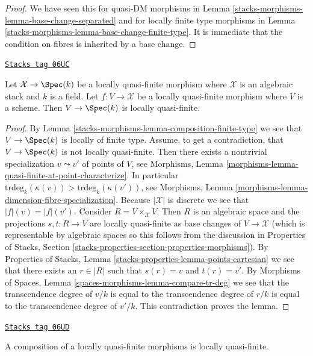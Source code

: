 \begin{proof}
We have seen this for quasi-DM morphisms in
Lemma \ref{stacks-morphisms-lemma-base-change-separated}
and for locally finite type morphisms in
Lemma \ref{stacks-morphisms-lemma-base-change-finite-type}.
It is immediate that the condition on fibres is inherited by a base change.
\end{proof}

\begin{lemma}
\label{stacks-morphisms-lemma-locally-quasi-finite-over-field}
\href{https://stacks.math.columbia.edu/tag/06UC}{\texttt{Stacks tag 06UC}}

Let $\mathcal{X} \to \Spec(k)$ be a locally quasi-finite morphism
where $\mathcal{X}$ is an algebraic stack and $k$ is a field.
Let $f : V \to \mathcal{X}$ be a locally quasi-finite morphism where
$V$ is a scheme. Then $V \to \Spec(k)$ is locally quasi-finite.
\end{lemma}

\begin{proof}
By
Lemma \ref{stacks-morphisms-lemma-composition-finite-type}
we see that $V \to \Spec(k)$ is locally of finite type.
Assume, to get a contradiction, that $V \to \Spec(k)$ is not
locally quasi-finite. Then there exists a nontrivial specialization
$v \leadsto v'$ of points of $V$, see
Morphisms, Lemma \ref{morphisms-lemma-quasi-finite-at-point-characterize}.
In particular $\text{trdeg}_k(\kappa(v)) > \text{trdeg}_k(\kappa(v'))$, see
Morphisms, Lemma \ref{morphisms-lemma-dimension-fibre-specialization}.
Because $|\mathcal{X}|$ is discrete we see that $|f|(v) = |f|(v')$.
Consider $R = V \times_\mathcal{X} V$. Then $R$ is an algebraic space
and the projections $s, t : R \to V$ are locally quasi-finite as base
changes of $V \to \mathcal{X}$ (which is representable by algebraic spaces
so this follows from the discussion in
Properties of Stacks, Section
\ref{stacks-properties-section-properties-morphisms}).
By
Properties of Stacks, Lemma \ref{stacks-properties-lemma-points-cartesian}
we see that there exists an $r \in |R|$ such that $s(r) = v$ and $t(r) = v'$.
By
Morphisms of Spaces, Lemma \ref{spaces-morphisms-lemma-compare-tr-deg}
we see that the transcendence degree of $v/k$ is equal to the
transcendence degree of $r/k$ is equal to the transcendence degree of
$v'/k$. This contradiction proves the lemma.
\end{proof}

\begin{lemma}
\label{stacks-morphisms-lemma-composition-locally-quasi-finite}
\href{https://stacks.math.columbia.edu/tag/06UD}{\texttt{Stacks tag 06UD}}

A composition of a locally quasi-finite morphisms is locally quasi-finite.
\end{lemma}

